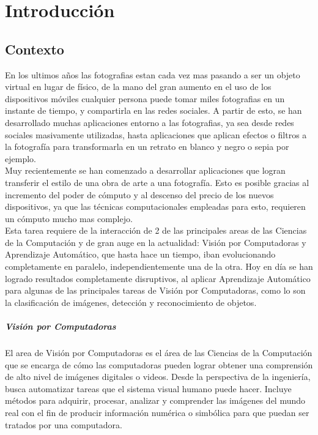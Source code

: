 \documentclass[a4paper,11pt,spanish]{book}
\begin{document}
\tableofcontents 

\chapter{Introducción}
  \section {Contexto}
    En los ultimos años las fotografias estan cada vez mas pasando a ser un objeto virtual en lugar de físico, de la mano del gran aumento en el uso de los dispositivos móviles 
    cualquier persona puede tomar miles fotografias en un instante de tiempo, y compartirla en las redes sociales.
    A partir de esto, se han desarrollado muchas aplicaciones entorno a las fotografias, ya sea desde redes sociales masivamente utilizadas, hasta aplicaciones que aplican efectos o filtros 
    a la fotografía para transformarla en un retrato en blanco y negro o sepia por ejemplo. \\
    Muy recientemente se han comenzado a desarrollar aplicaciones que logran transferir el estilo de una obra de arte a una fotografía. Esto es posible gracias al incremento 
    del poder de cómputo y al descenso del precio de los nuevos dispositivos, ya que las técnicas computacionales empleadas para esto, requieren un cómputo mucho mas complejo.\\
    Esta tarea requiere de la interacción de 2 de las principales areas de las Ciencias de la Computación y de gran auge en la actualidad: Visión por Computadoras y Aprendizaje Automático,
    que hasta hace un tiempo, iban evolucionando completamente en paralelo, independientemente una de la otra. Hoy en día se han logrado resultados completamente disruptivos, al aplicar
    Aprendizaje Automático para algunas de las principales tareas de Visión por Computadoras, como lo son la clasificación de imágenes, detección y reconocimiento de objetos.\\
    \paragraph{Visión por Computadoras}
    El area de Visión por Computadoras es el área de las Ciencias de la Computación que se encarga de cómo las computadoras pueden lograr obtener una comprensión de alto nivel de imágenes digitales o videos. 
    Desde la perspectiva de la ingeniería, busca automatizar tareas que el sistema visual humano puede hacer. Incluye métodos para adquirir, procesar, analizar y comprender las imágenes del mundo real 
    con el fin de producir información numérica o simbólica para que puedan ser tratados por una computadora.\\
\end{document}
